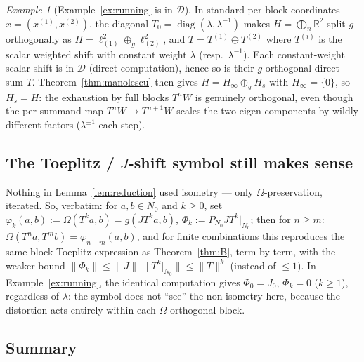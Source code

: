 \documentclass[11pt,a4paper]{article}
\theoremstyle{definition}
\theoremstyle{remark}
\newtheorem{example}[theorem]{Example}
\newcommand{\R}{\mathbb{R}}
\newcommand{\cJ}{J}
\newcommand{\Om}{\Omega}
\begin{document}
\begin{example}[Example~\ref{ex:running} is in $\mathcal D$]
In standard per-block coordinates $x=(x^{(1)},x^{(2)})$, the diagonal
$T_0=\operatorname{diag}(\lambda,\lambda^{-1})$ makes $H=\bigoplus_n\R^2$ split
$g$-orthogonally as $H=\ell^2_{(1)}\oplus_g\ell^2_{(2)}$, and
$T=T^{(1)}\oplus T^{(2)}$ where $T^{(i)}$ is the scalar weighted shift with constant weight
$\lambda$ (resp.\ $\lambda^{-1}$). Each constant-weight scalar shift is in $\mathcal D$
(direct computation), hence so is their $g$-orthogonal direct sum $T$. Theorem~\ref{thm:manolescu}
then gives $H=H_\infty\oplus_gH_s$ with $H_\infty=\{0\}$, so $H_s=H$: the exhaustion by
full blocks $T^nW$ is genuinely orthogonal, even though the per-summand map
$T^nW\to T^{n+1}W$ scales the two eigen-components by wildly different factors
($\lambda^{\pm1}$ each step).
\end{example}

\subsection{The Toeplitz / $J$-shift symbol still makes sense}

Nothing in Lemma~\ref{lem:reduction} used isometry --- only $\Om$-preservation, iterated.
So, verbatim: for $a,b\in N_0$ and $k\ge0$, set
$\varphi_k(a,b):=\Om(T^ka,b)=g(\cJ T^ka,b)$, $\Phi_k:=P_{N_0}\cJ T^k|_{N_0}$; then for
$n\ge m$: $\Om(T^na,T^mb)=\varphi_{n-m}(a,b)$, and for finite combinations this reproduces
the same block-Toeplitz expression as Theorem~\ref{thm:B}, term by term, with the weaker
bound $\|\Phi_k\|\le\|\cJ\|\,\|T^k|_{N_0}\|\le\|T\|^k$ (instead of $\le1$). In
Example~\ref{ex:running}, the identical computation gives $\Phi_0=J_0$, $\Phi_k=0$
($k\ge1$), regardless of $\lambda$: the symbol does not ``see'' the non-isometry here,
because the distortion acts entirely within each $\Om$-orthogonal block.

\subsection{Summary}
\end{document}
